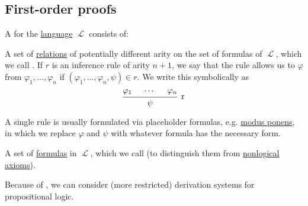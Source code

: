 \subsection{First-order proofs}\label{subsec:first_order_proofs}

\begin{definition}\label{def:first_order_axiomatic_derivation_system}
  A  for the \hyperref[def:first_order_syntax]{language} \( \mscrL \) consists of:

  \begin{thmenum}
     A set of \hyperref[def:relation]{relations} of potentially different arity on the set of formulas of \( \mscrL \), which we call . If \( r \) is an inference rule of arity \( n + 1 \), we say that the rule allows us to  \( \varphi \) from \( \varphi_1, \ldots, \varphi_n \) if \( (\varphi_1, \ldots, \varphi_n, \psi) \in r \). We write this symbolically as
    \begin{equation*}
      \begin{prooftree}
        \hypo{\varphi_1}
        \hypo{\cdots}
        \hypo{\varphi_n}
        \infer3[r]{\psi}
      \end{prooftree}
    \end{equation*}

    A single rule is usually formulated via placeholder formulas, e.g. \hyperref[eq:def:implicational_logic/rules/modus_ponens]{modus ponens}, in which we replace \( \varphi \) and \( \psi \) with whatever formula has the necessary form.

     A set of \hyperref[def:first_order_syntax]{formulas} in \( \mscrL \), which we call  (to distinguish them from \hyperref[def:first_order_derivability/axioms_and_theorems]{nonlogical axioms}).
  \end{thmenum}

  Because of , we can consider (more restricted) derivation systems for propositional logic.
\end{definition}

